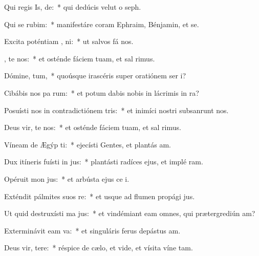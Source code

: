 \item Qui regis Is, de:~* qui dedúcis velut o seph.
\item Qui se  rubim:~* manifestáre coram Ephraim, Bénjamin, et se.
\item Excita poténtiam ,  ni:~* ut salvos fá nos.
\item {}, te nos:~* et osténde fáciem tuam, et sal rimus.
\item Dómine,  tum,~* quoúsque irascéris super oratiónem ser i?
\item Cibábis nos pa rum:~* et potum dabis nobis in lácrimis in ra?
\item Posuísti nos in contradictiónem  tris:~* et inimíci nostri subsanrunt nos.
\item Deus vir, te nos:~* et osténde fáciem tuam, et sal rimus.
\item Víneam de Ægýp ti:~* ejecísti Gentes, et plantás am.
\item Dux itíneris fuísti in  jus:~* plantásti radíces ejus, et implé ram.
\item Opéruit mon  jus:~* et arbústa ejus ce i.
\item Exténdit pálmites suos   re:~* et usque ad flumen propági jus.
\item Ut quid destruxísti ma jus:~* et vindémiant eam omnes, qui prætergrediún am?
\item Exterminávit eam   va:~* et singuláris ferus depástus  am.
\item Deus vir, tere:~* réspice de cælo, et vide, et vísita víne tam.
